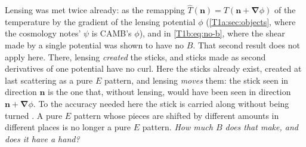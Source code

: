 Lensing was met twice already: as the remapping $\hat T(\bm n)=T(\bm n+\bm\nabla\phi)$ of the temperature by the gradient of the lensing potential $\phi$ (\cref{T1a:sec:objects}, where the cosmology notes' $\psi$ is CAMB's $\phi$), and in \cref{T1b:eq:no-b}, where the shear made by a single potential was shown to have no $B$. That second result does not apply here. There, lensing \emph{created} the sticks, and sticks made as second derivatives of one potential have no curl. Here the sticks already exist, created at last scattering as a pure $E$ pattern, and lensing \emph{moves} them: the stick seen in direction $\bm n$ is the one that, without lensing, would have been seen in direction $\bm n+\bm\nabla\phi$. To the accuracy needed here the stick is carried along without being turned \cite{LewisChallinor2006}. A pure $E$ pattern whose pieces are shifted by different amounts in different places is no longer a pure $E$ pattern. \emph{How much $B$ does that make, and does it have a hand?}

